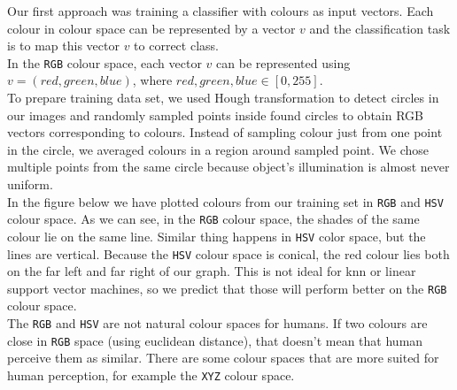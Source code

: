 \documentclass[12pt,a4paper]{article}
\begin{document}
	Our first approach was training a classifier with colours as input vectors. Each colour in colour space can be represented by a vector $v$ and the classification task is to map this vector $v$ to correct class. \\
	
	In the \texttt{RGB} colour space, each vector $v$ can be represented using $v = (red, green, blue)$, where $red, green, blue \in [0, 255]$. \\
	
	To prepare training data set, we used Hough transformation to detect circles in our images and randomly sampled points inside found circles to obtain RGB vectors corresponding to colours. Instead of sampling colour just from one point in the circle, we averaged colours in a region around sampled point. We chose multiple points from the same circle because object's illumination is almost never uniform. \\
	
	In the figure below we have plotted colours from our training set in \texttt{RGB} and \texttt{HSV} colour space. As we can see, in the \texttt{RGB} colour space, the shades of the same colour lie on the same line. Similar thing happens in \texttt{HSV} color space, but the lines are vertical. Because the \texttt{HSV} colour space is conical, the red colour lies both on the far left and far right of our graph. This is not ideal for knn or linear support vector machines, so we predict that those will perform better on the \texttt{RGB} colour space. \\
	
	The \texttt{RGB} and \texttt{HSV} are not natural colour spaces for humans. If two colours are close in \texttt{RGB} space (using euclidean distance), that doesn't mean that human perceive them as similar. There are some colour spaces that are more suited for human perception, for example the \texttt{XYZ} colour space. \\
	
	
\end{document}
